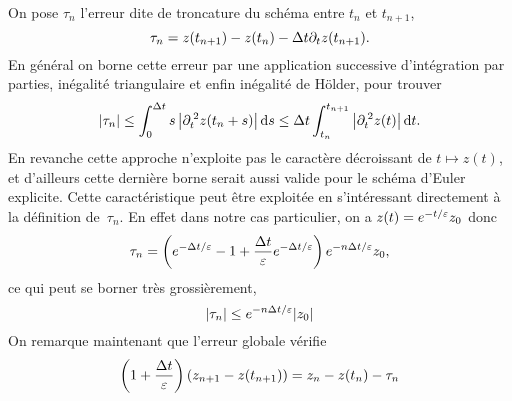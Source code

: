 On pose $\tau_n$ l'erreur dite de troncature du schéma entre $t_n$ et
$t_{n+1}$,
\begin{equation*}
    \tau_n = z(t_{n+1}) - z(t_n) - \Delta t \partial_t z(t_{n+1}) .
\end{equation*}
En général on borne cette erreur par une application successive
d'intégration par parties, inégalité triangulaire et enfin inégalité de
Hölder, pour trouver
\begin{equation} \label{sec:intro:eq:euler_err1}
    \left| \tau_n \right| 
    \leq \int_0^{\Delta t} s \left| \partial_t^{\:2} z(t_n + s) \right| \mathrm{d} s
    \leq \Delta t \int_{t_n}^{t_{n+1}} \left| \partial_t^{\:2} z(t) \right| \mathrm{d} t.
\end{equation}
En revanche cette approche n'exploite pas le caractère décroissant de $t
\mapsto z(t)$, et d'ailleurs cette dernière borne serait aussi valide
pour le schéma d'Euler explicite. Cette caractéristique peut être
exploitée en s'intéressant directement à la définition de~$\tau_n$. En
effet dans notre cas particulier, on a $z(t) = e^{-t/\varepsilon} z_0$ donc 
\begin{equation*}
    \tau_n = \left(
        e^{-\Delta t/\varepsilon} - 1 + \frac{\Delta t}{\varepsilon}e^{-\Delta t/\varepsilon}
        \right) e^{-n \Delta t/\varepsilon} z_0 ,
\end{equation*}
ce qui peut se borner très grossièrement,
\begin{equation} \label{sec:intro:eq:euler_err2}
    |\tau_n| \leq e^{-n \Delta t/\varepsilon} |z_0|
\end{equation}
On remarque maintenant que l'erreur globale vérifie 
\begin{equation*}
    \left(1 + \frac{\Delta t}{\varepsilon}\right) \left( z_{n+1} - z(t_{n+1})\right)
    = z_n - z(t_n) - \tau_n 
\end{equation*}
